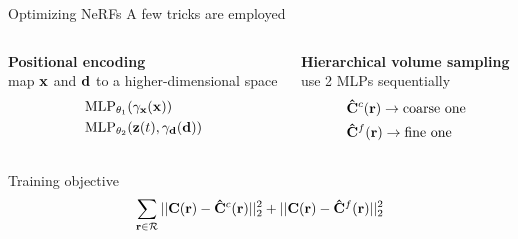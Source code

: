 \documentclass[aspectratio=1610]{beamer}
\begin{document}
\begin{frame}{Optimizing NeRFs}
    A few tricks are employed
    \bigskip
    \pause
    \begin{columns}[t]
        \begin{column}{.4\textwidth}
            \textbf{Positional encoding}\\
            map \(\vb{x}\) and \(\vb{d}\) to a higher-dimensional space
            \begin{align*}
                &\textrm{MLP}_{\theta_1} (\gamma_{\vb{x}}(\vb{x})) \\
                &\textrm{MLP}_{\theta_2} (\vb{z}(t), \gamma_{\vb{d}}(\vb{d}))
            \end{align*}
        \end{column}
        \pause
        \begin{column}{.4\textwidth}
            \textbf{Hierarchical volume sampling}\\
            use 2 MLPs sequentially
            \begin{align*}
                &\vb{\hat{C}}^c(\vb{r}) \rightarrow \textrm{coarse one}\\
                &\vb{\hat{C}}^f(\vb{r}) \rightarrow \textrm{fine one}
            \end{align*}
        \end{column}
    \end{columns}
    \bigskip
    \pause
    \begin{block}{Training objective}
        \begin{equation}
            \sum_{\vb{r} \in \mathcal{R}} ||\vb{C}(\vb{r}) - \vb{\hat{C}}^c(\vb{r})||_2^2 + ||\vb{C}(\vb{r}) - \vb{\hat{C}}^f(\vb{r})||_2^2
        \end{equation}
    \end{block}
\end{frame}
\end{document}
